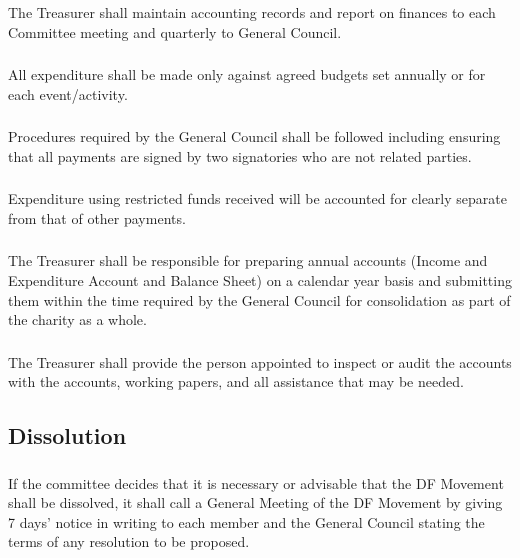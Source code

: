 \documentclass[a4paper, 12pt]{report}
\begin{document}
\subsubsection{}
The Treasurer shall maintain accounting records and report on finances to each Committee meeting and quarterly to General Council.
\subsubsection{}
All expenditure shall be made only against agreed budgets set annually or for each event/activity.
\subsubsection{}
Procedures required by the General Council shall be followed including ensuring that all payments are signed by two signatories who are not related parties.
\subsubsection{}
Expenditure using restricted funds received will be accounted for clearly separate from that of other payments.
\subsubsection{}
The Treasurer shall be responsible for preparing annual accounts (Income and Expenditure Account and Balance Sheet) on a calendar year basis and submitting them within the time required by the General Council for consolidation as part of the charity as a whole.
\subsubsection{}
The Treasurer shall provide the person appointed to inspect or audit the accounts with the accounts, working papers, and all assistance that may be needed.

\subsection{Dissolution}
\subsubsection{}
If the committee decides that it is necessary or advisable that the DF Movement shall be dissolved, it shall call a General Meeting of the DF Movement by giving 7 days' notice in writing to each member and the General Council stating the terms of any resolution to be proposed.
\end{document}
